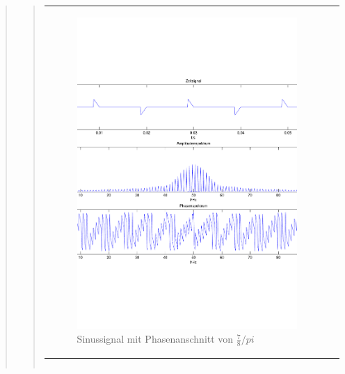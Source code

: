 \begin{quote}
\begin{quote}
\begin{center}
\begin{tabular}{ll}
\begin{minipage}{0.6\textwidth}
                   \begin{figure}[H]
                        \label{fig:}
                        \includegraphics[scale=0.3]{./Bilder/Phasenanschnitt78pi.pdf} %
                        \caption{Sinussignal mit Phasenanschnitt von $\frac{7}{8}/pi$}
                    \end{figure}
                 \vspace{-1.5em}

                \end{minipage}

            \end{tabular}
            \end{center}
            
            \begin{center}
            \begin{tabular}{ll}


\end{tabular}
\end{center}
\end{quote}
\end{quote}
